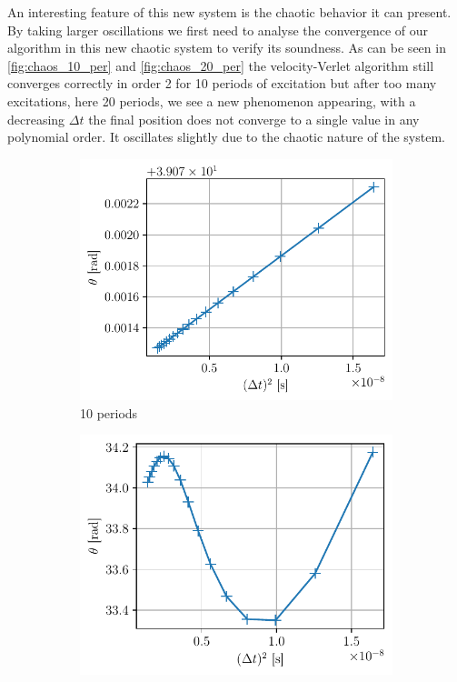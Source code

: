 An interesting feature of this new system is the chaotic behavior it can present. By taking larger oscillations we first need to analyse the convergence of our algorithm in this new chaotic system to verify its soundness. As can be seen in \autoref{fig:chaos_10_per} and \autoref{fig:chaos_20_per} the velocity-Verlet algorithm still converges correctly in order 2 for 10 periods of excitation but after too many excitations, here 20 periods, we see a new phenomenon appearing, with a decreasing $\Delta t$ the final position does not converge to a single value in any polynomial order. It oscillates slightly due to the chaotic nature of the system.
\begin{figure}[h]
    \centering
    \begin{subfigure}{0.48\linewidth}
        \centering
        \includegraphics[width=\linewidth]{figures/chaos1_10_periods_conv.pdf}
        \caption{10 periods}
        \label{fig:chaos_10_per}
    \end{subfigure}
    \begin{subfigure}{0.48\linewidth}
        \centering
        \includegraphics[width=\linewidth]{figures/chaos1_20_periods_conv.pdf}

\end{subfigure}
\end{figure}
